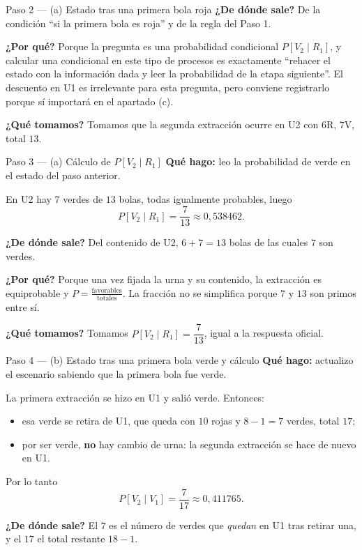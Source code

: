 \documentclass[11pt]{article}
\begin{document}
\begin{sol}
\begin{paso}{Paso 2 --- (a) Estado tras una primera bola roja}
\textbf{¿De d\'onde sale?} De la condici\'on ``si la primera bola es roja'' y de la regla del Paso 1.

\textbf{¿Por qu\'e?} Porque la pregunta es una probabilidad condicional $P[V_2\mid R_1]$, y calcular una condicional en este tipo de procesos es exactamente ``rehacer el estado con la informaci\'on dada y leer la probabilidad de la etapa siguiente''. El descuento en U1 es irrelevante para esta pregunta, pero conviene registrarlo porque s\'i importar\'a en el apartado (c).

\textbf{¿Qu\'e tomamos?} Tomamos que la segunda extracci\'on ocurre en U2 con $6$R, $7$V, total $13$.
\end{paso}

\begin{paso}{Paso 3 --- (a) C\'alculo de $P[V_2\mid R_1]$}
\textbf{Qu\'e hago:} leo la probabilidad de verde en el estado del paso anterior.

En U2 hay $7$ verdes de $13$ bolas, todas igualmente probables, luego
\[
P[V_2\mid R_1]=\frac{7}{13}\approx 0{,}538462 .
\]

\textbf{¿De d\'onde sale?} Del contenido de U2, $6+7=13$ bolas de las cuales $7$ son verdes.

\textbf{¿Por qu\'e?} Porque una vez fijada la urna y su contenido, la extracci\'on es equiprobable y $P=\frac{\text{favorables}}{\text{totales}}$. La fracci\'on no se simplifica porque $7$ y $13$ son primos entre s\'i.

\textbf{¿Qu\'e tomamos?} Tomamos $P[V_2\mid R_1]=\dfrac{7}{13}$, igual a la respuesta oficial.
\end{paso}

\begin{paso}{Paso 4 --- (b) Estado tras una primera bola verde y c\'alculo}
\textbf{Qu\'e hago:} actualizo el escenario sabiendo que la primera bola fue verde.

La primera extracci\'on se hizo en U1 y sali\'o verde. Entonces:
\begin{itemize}[leftmargin=*]
  \item esa verde se retira de U1, que queda con $10$ rojas y $8-1=7$ verdes, total $17$;
  \item por ser verde, \textbf{no} hay cambio de urna: la segunda extracci\'on se hace de nuevo en U1.
\end{itemize}
Por lo tanto
\[
P[V_2\mid V_1]=\frac{7}{17}\approx 0{,}411765 .
\]

\textbf{¿De d\'onde sale?} El $7$ es el n\'umero de verdes que \emph{quedan} en U1 tras retirar una, y el $17$ el total restante $18-1$.


\end{paso}
\end{sol}
\end{document}
